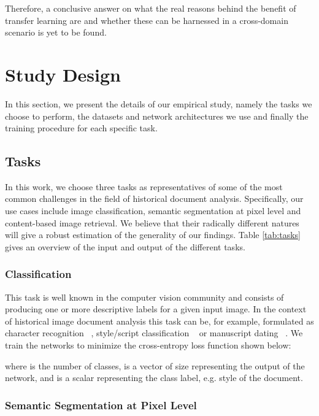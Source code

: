 \documentclass[journal]{IEEEtran}
\newcommand{\af}[1]{{\color{black}#1}}
\begin{document}
Therefore, a conclusive answer on what the real reasons behind the benefit of transfer learning are and whether these can be harnessed in a cross-domain scenario is yet to be found.


 
\section{Study Design}\label{toc:experimental_setting}

In this section, we present the details of our \af{empirical study}, namely the tasks we choose to perform, the datasets and network architectures we use and finally the training procedure for each specific task. 


\subsection{Tasks}
In this work, we choose three tasks as representatives of \af{some of} the most common challenges in the \af{field of historical document analysis}.
Specifically, our use cases include image classification, \af{semantic segmentation at pixel level and content-based image retrieval}.
We believe that their radically different natures will give a robust estimation of the generality of our findings.
Table \ref{tab:tasks} gives an overview of the input and output of the different tasks.

\subsubsection{Classification}

This task is well known in the computer vision community and consists of producing one or more descriptive labels for a given input image.
In the context of historical image document analysis this task can be, for example, formulated as character recognition ~\cite{clanuwat2018deep,vamvakas2008complete}, style/script classification ~\cite{al2011recognition,cloppet2017icdar2017} or \af{manuscript dating ~\cite{cloppet2017icdar2017,wahlberg2016historical}}.
We train the networks to minimize the cross-entropy loss function shown below:

where  is the number of classes,  is a vector of size  representing the output of the network, and  \af{is a scalar} representing the class label, e.g. style of the document.

\subsubsection{Semantic Segmentation at Pixel Level}
\end{document}
